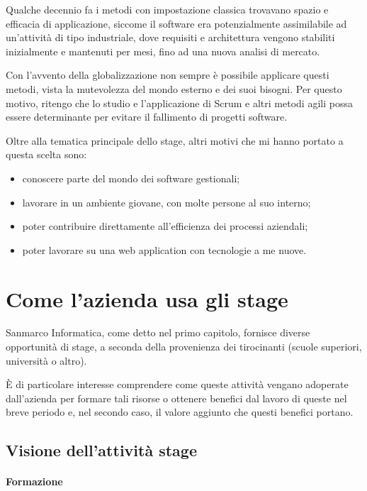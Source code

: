 Qualche decennio fa i metodi con impostazione classica trovavano spazio
e efficacia di applicazione, siccome il software era potenzialmente
assimilabile ad un'attività di tipo industriale, dove requisiti e architettura
vengono stabiliti inizialmente e mantenuti per mesi, fino ad una nuova analisi
di mercato.

Con l'avvento della globalizzazione non sempre è possibile applicare questi
metodi, vista la mutevolezza del mondo esterno e dei suoi bisogni. Per questo
motivo, ritengo che lo studio e l'applicazione di Scrum e altri metodi
agili possa essere determinante per evitare il fallimento di progetti
software.

Oltre alla tematica principale dello stage, altri motivi che mi hanno portato
a questa scelta sono:

\begin{itemize}
\item conoscere parte del mondo dei software gestionali;
\item lavorare in un ambiente giovane, con molte persone al suo interno;
\item poter contribuire direttamente all'efficienza dei processi aziendali;
\item poter lavorare su una web application con tecnologie a me nuove.
\end{itemize}

\section{Come l'azienda usa gli stage}

Sanmarco Informatica, come detto nel primo capitolo, fornisce diverse
opportunità di stage, a seconda della provenienza dei tirocinanti (scuole
superiori, università o altro).

È di particolare interesse comprendere come queste attività vengano adoperate
dall'azienda per formare tali risorse o ottenere benefici dal lavoro di queste
nel breve periodo e, nel secondo caso, il valore aggiunto che questi benefici
portano.

\subsection{Visione dell'attività stage}

\paragraph{Formazione} \mbox{} \\

